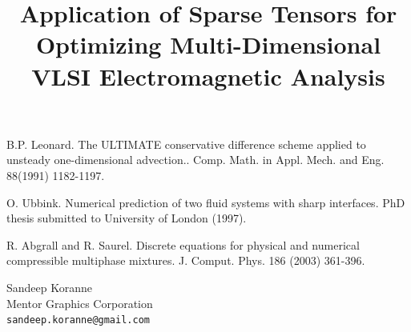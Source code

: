 \documentclass[article,A4,11pt]{llncs}%
\begin{document}

\begin{thebibliography}{10}
{\sc B.P. Leonard}. {The ULTIMATE conservative difference scheme applied to unsteady one-dimensional advection.}. Comp. Math. in Appl. Mech. and Eng. 88(1991) 1182-1197.

{\sc O. Ubbink}. {Numerical prediction of two fluid systems with sharp interfaces}. PhD thesis submitted to University of London (1997).

{\sc R. Abgrall and R. Saurel}. {Discrete equations for physical and numerical compressible multiphase mixtures}. J. Comput. Phys. 186 (2003) 361-396.
\end{thebibliography}

\title{Application of Sparse Tensors for Optimizing Multi-Dimensional VLSI Electromagnetic Analysis}
 \author{} \institute{}
\maketitle
\begin{center}
{\large Sandeep Koranne}\\
Mentor Graphics Corporation\\
{\tt sandeep.koranne@gmail.com}
\end{center}
\end{document}

